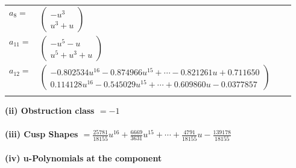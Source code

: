\documentclass[1p]{elsarticle_modified}
\theoremstyle{definition}
\begin{document}
\begin{tabular}{m{7pt} m{180pt} m{7pt} m{180pt} }
\flushright $a_{8}=$&$\begin{pmatrix}- u^3\\u^3+u\end{pmatrix}$ \\
\flushright $a_{11}=$&$\begin{pmatrix}- u^5- u\\u^5+u^3+u\end{pmatrix}$ \\
\flushright $a_{12}=$&$\begin{pmatrix}-0.802534 u^{16}-0.874966 u^{15}+\cdots-0.821261 u+0.711650\\0.114128 u^{16}-0.545029 u^{15}+\cdots+0.609860 u-0.0377857\end{pmatrix}$\\&\end{tabular}
\flushleft \textbf{(ii) Obstruction class $= -1$}\\~\\
\flushleft \textbf{(iii) Cusp Shapes $= \frac{25781}{18155} u^{16}+\frac{6669}{3631} u^{15}+\cdots+\frac{4791}{18155} u-\frac{139178}{18155}$}\\~\\
\newpage\renewcommand{\arraystretch}{1}
\flushleft \textbf{(iv) u-Polynomials at the component}\newline \\
\end{document}
